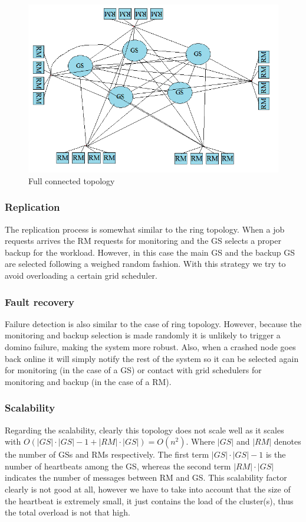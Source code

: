 \begin{figure}
\centering
	\includegraphics[scale=0.61]{full.png}
	\caption{Full connected topology}
\end{figure}

\subsubsection{Replication}

The replication process is somewhat similar to the ring topology. When a job requests arrives the RM requests for monitoring and the GS selects a proper backup for the workload. However, in this case the main GS and the backup GS are selected following a weighed random fashion. With this strategy we try to avoid overloading a certain grid scheduler.

\subsubsection{Fault recovery}

Failure detection is also similar to the case of ring topology. However, because the monitoring and backup selection is made randomly it is unlikely to trigger a domino failure, making the system more robust. Also, when a crashed node goes back online it will simply notify the rest of the system so it can be selected again for monitoring (in the case of a GS) or contact with grid schedulers for monitoring and backup (in the case of a RM). 

\subsubsection{Scalability}
Regarding the scalability, clearly this topology does not scale well as it scales with $O(|GS|\cdot |GS|-1 + |RM|\cdot |GS|) = O(n^2)$. Where $|GS|$ and $|RM|$ denotes the number of GSs and RMs respectively. The first term $|GS|\cdot |GS|-1$ is the number of heartbeats among the GS, whereas the second term $|RM|\cdot |GS|$ indicates the number of messages between RM and GS. This scalability factor clearly is not good at all, however we have to take into account that the size of the heartbeat is extremely small, it just contains the load of the cluster(s), thus the total overload is not that high.

